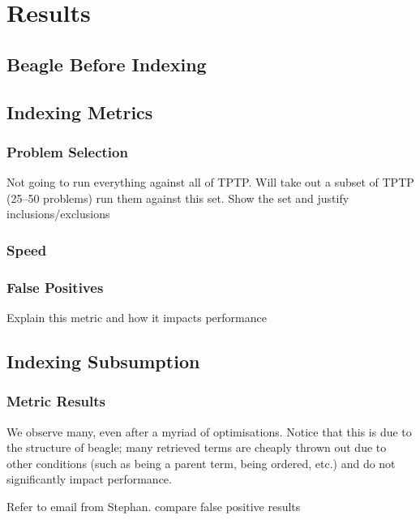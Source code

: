 
\chapter{Results}
\label{cha:results}

\section{Beagle Before Indexing}
\label{sec:preindexing}

\section{Indexing Metrics}
\label{sec:metrics}

\subsection{Problem Selection}
Not going to run everything against all of TPTP. Will take out a subset
of TPTP (25--50 problems) run them against this set.
Show the set and justify inclusions/exclusions

\subsection{Speed}

\subsection{False Positives}
Explain this metric and how it impacts performance

\section{Indexing Subsumption}
\label{sec:indexresults}

\subsection{Metric Results}

We observe many, even after a myriad of optimisations. Notice
that this is due to the structure of beagle; many retrieved terms
are cheaply thrown out due to other conditions (such as being a parent
term, being ordered, etc.) and do not significantly impact performance.

Refer to email from Stephan. compare false positive results


